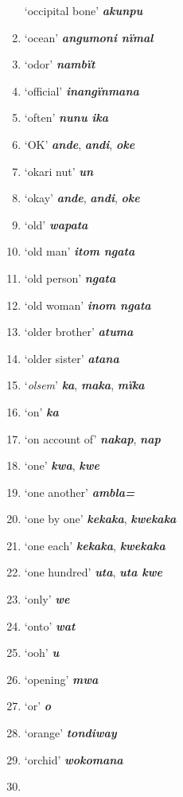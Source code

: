 \begin{enumerate}[noitemsep, label={}, align=left, widest=190, labelsep=1ex,leftmargin=*,itemindent=-10pt]
‘occipital bone’ \textbf{\textit{akunpu}} \item
‘ocean’ \textbf{\textit{angumoni nïmal}} \item
‘odor’ \textbf{\textit{nambït}} \item
‘official’ \textbf{\textit{inangïnmana}} \item
‘often’ \textbf{\textit{nunu ika}} \item
‘OK’ \textbf{\textit{ande}}, \textbf{\textit{andi}}, \textbf{\textit{oke}} \item
‘okari nut’ \textbf{\textit{un}} \item
‘okay’ \textbf{\textit{ande}}, \textbf{\textit{andi}}, \textbf{\textit{oke}} \item
‘old’ \textbf{\textit{wapata}} \item
‘old man’ \textbf{\textit{itom ngata}} \item
‘old person’ \textbf{\textit{ngata}} \item
‘old woman’ \textbf{\textit{inom ngata}} \item
‘older brother’ \textbf{\textit{atuma}} \item
‘older sister’ \textbf{\textit{atana}} \item
‘\textit{olsem}’ \textbf{\textit{ka}}, \textbf{\textit{maka}}, \textbf{\textit{mïka}} \item
‘on’ \textbf{\textit{ka}} \item
‘on account of’ \textbf{\textit{nakap}}, \textbf{\textit{nap}} \item
‘one’ \textbf{\textit{kwa}}, \textbf{\textit{kwe}} \item
‘one another’ \textbf{\textit{ambla=}} \item
‘one by one’ \textbf{\textit{kekaka}}, \textbf{\textit{kwekaka}} \item
‘one each’ \textbf{\textit{kekaka}}, \textbf{\textit{kwekaka}} \item
‘one hundred’ \textbf{\textit{uta}}, \textbf{\textit{uta kwe}} \item
‘only’ \textbf{\textit{we}} \item
‘onto’ \textbf{\textit{wat}} \item
‘ooh’ \textbf{\textit{u}} \item
‘opening’ \textbf{\textit{mwa}} \item
‘or’ \textbf{\textit{o}} \item
‘orange’ \textbf{\textit{tondiway}} \item
‘orchid’ \textbf{\textit{wokomana}} \item

\end{enumerate}
